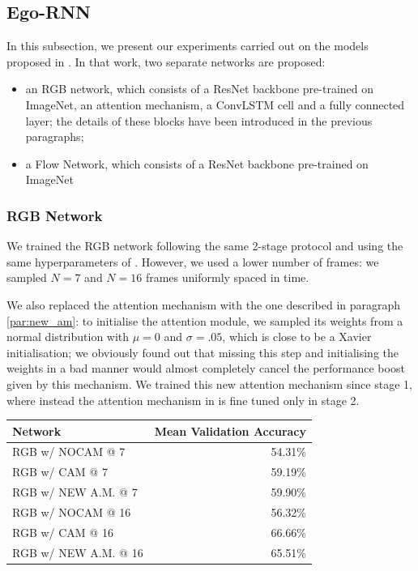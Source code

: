 \documentclass[10pt,twocolumn,letterpaper]{article}
\begin{document}
\subsection{Ego-RNN}

In this subsection, we present our experiments carried out on the models proposed in \cite{Ego-RNN}. In that work, two separate networks are proposed:
\begin{itemize}
	\item an RGB network, which consists of a ResNet backbone pre-trained on ImageNet, an attention mechanism, a ConvLSTM cell and a fully connected layer; the details of these blocks have been introduced in the previous paragraphs;
	\item a Flow Network, which consists of a ResNet backbone pre-trained on ImageNet
\end{itemize}

\subsubsection{RGB Network}

We trained the RGB network following the same 2-stage protocol and using the same hyperparameters of \cite{Ego-RNN}. However, we used a lower number of frames: we sampled $N = 7$ and $N = 16$ frames uniformly spaced in time.

We also replaced the attention mechanism with the one described in paragraph \ref{par:new_am}: to initialise the attention module, we sampled its weights from a normal distribution with $\mu = 0$ and $\sigma = .05$, which is close to be a Xavier initialisation; we obviously found out that missing this step and initialising the weights in a bad manner would almost completely cancel the performance boost given by this mechanism. We trained this new attention mechanism since stage 1, where instead the attention mechanism in \cite{Ego-RNN} is fine tuned only in stage 2.

\vspace{12pt} \noindent
\begin{tabular}{l|r}
	Network & Mean Validation Accuracy \\
	\hline
	RGB w/ NOCAM @ 7 & 54.31\% \\
	RGB w/ CAM @ 7 & 59.19\% \\
	RGB w/ NEW A.M. @ 7 & 59.90\% \\
	\hline
	RGB w/ NOCAM @ 16 & 56.32\% \\
	RGB w/ CAM @ 16 & 66.66\% \\
	RGB w/ NEW A.M. @ 16 & 65.51\% \\
\end{tabular} \vspace{6pt}
\end{document}
